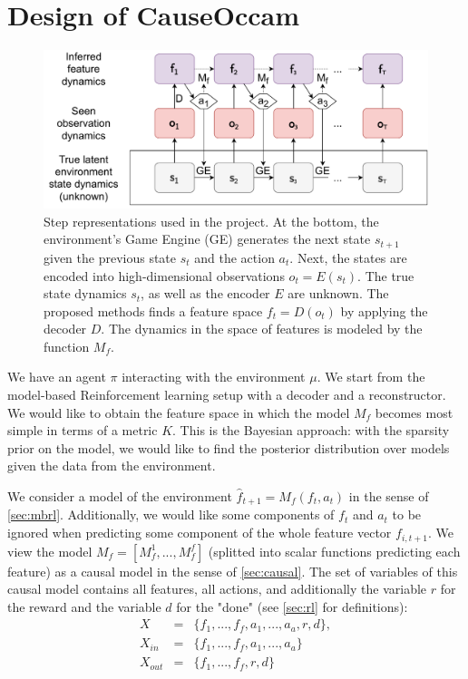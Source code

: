 \documentclass[a4paper,11pt,oneside]{report}
\newcommand{\sysname}{CauseOccam\xspace}
\begin{document}
\chapter{Design of \sysname}
\label{ch:design}
\begin{figure}[h]
    \centering
    \includegraphics[width=0.7\linewidth]{diagrams/step_spaces}
    \caption{Step representations used in the project. At the bottom, the environment's Game Engine (GE) generates the next state $s_{t+1}$ given the previous state $s_t$ and the action $a_t$. Next, the states are encoded into high-dimensional observations $o_t=E(s_t)$. The true state dynamics $s_t$, as well as the encoder $E$ are unknown. The proposed methods finds a feature space $f_t=D(o_t)$ by applying the decoder $D$. The dynamics in the space of features is modeled by the function $M_f$.}
    \label{fig:step_spaces}
\end{figure}


We have an agent $\pi$ interacting with the environment $\mu$. We start from the model-based Reinforcement learning setup with a decoder and a reconstructor. We would like to obtain the feature space in which the model $M_f$ becomes most simple in terms of a metric $K$. This is the Bayesian approach: with the sparsity prior on the model, we would like to find the posterior distribution over models given the data from the environment.

We consider a model of the environment $\hat{f}_{t+1}=M_f(f_t,a_t)$ in the sense of \autoref{sec:mbrl}. Additionally, we would like some components of $f_t$ and $a_t$ to be ignored when predicting some component of the whole feature vector $f_{i,t+1}$. We view the model $M_f=[M_f^1,...,M_f^f]$ (splitted into scalar functions predicting each feature) as a causal model in the sense of \autoref{sec:causal}. The set of variables of this causal model contains all features, all actions, and additionally the variable $r$ for the reward and the variable $d$ for the "done" (see \autoref{sec:rl} for definitions):
$$
\begin{array}{lcl}
X&=&\{f_1,...,f_f,a_1,...,a_a,r,d\},\\
X_{in}&=&\{f_1,...,f_f,a_1,...,a_a\}\\
X_{out}&=&\{f_1,...,f_f,r,d\}
\end{array}
$$
\end{document}
